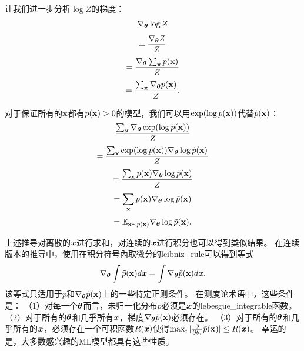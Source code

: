 让我们进一步分析$\log Z$的梯度：
\begin{equation}
	\nabla_{\boldsymbol{\theta}} \log Z
\end{equation}
\begin{equation}
	= \frac{ \nabla_{\boldsymbol{\theta}} Z }{Z}
\end{equation}
\begin{equation}
	= \frac{ \nabla_{\boldsymbol{\theta}} \sum_{\mathbf{x}} \tilde{p}(\mathbf{x}) }{Z}
\end{equation}
\begin{equation}
	= \frac{ \sum_{\mathbf{x}} \nabla_{\boldsymbol{\theta}} \tilde{p}(\mathbf{x}) }{Z}.
\end{equation}


对于保证所有的$\mathbf{x}$都有$p(\mathbf{x}) > 0$的模型，我们可以用$\exp(\log \tilde{p}(\mathbf{x}))$代替$\tilde{p}(\mathbf{x})$：
\begin{equation}
	\frac{ \sum_{\mathbf{x}} \nabla_{\boldsymbol{\theta}} \exp (\log \tilde{p} (\mathbf{x})) }{ Z }
\end{equation}
\begin{equation}
	= \frac{  \sum_{\mathbf{x}}  \exp (\log \tilde{p} (\mathbf{x})) \nabla_{\boldsymbol{\theta}} \log \tilde{p}(\mathbf{x})  }{Z}
\end{equation}
\begin{equation}
	=\frac{  \sum_{\mathbf{x}} \tilde{p} (\mathbf{x})  \nabla_{\boldsymbol{\theta}} \log \tilde{p}(\mathbf{x})  }{ Z}
\end{equation}
\begin{equation}
	=\sum_{\mathbf{x}} p(\mathbf{x}) \nabla_{\boldsymbol{\theta}} \log \tilde{p} ( \mathbf{x} )
 \end{equation}
\begin{equation}
	=\mathbb{E}_{\mathbf{x} \sim p(\mathbf{x})} \nabla_{\boldsymbol{\theta}} \log \tilde{p} (\mathbf{x}).
\end{equation}


上述推导对离散的$\boldsymbol{\mathit{x}}$进行求和，对连续的$\boldsymbol{\mathit{x}}$进行积分也可以得到类似结果。
在连续版本的推导中，使用在积分符号內取微分的\gls{leibniz_rule}可以得到等式
\begin{equation}
	\nabla_{\boldsymbol{\theta}} \int \tilde{p} (\mathbf{x}) d \boldsymbol{\mathit{x}}  = \int \nabla_{\boldsymbol{\theta}} 
\tilde{p} (\mathbf{x}) d \boldsymbol{\mathit{x}}.
\end{equation}
该等式只适用于$\tilde{p}$和$\nabla_{\boldsymbol{\theta}} \tilde{p} (\mathbf{x})$上的一些特定正则条件。
在测度论术语中，这些条件是：
（1）对每一个$\boldsymbol{\theta}$而言，未归一化分布$\tilde{p}$必须是$\boldsymbol{\mathit{x}}$的\gls{lebesgue_integrable}函数。
（2）对于所有的$\boldsymbol{\theta}$和几乎所有$\boldsymbol{\mathit{x}}$，梯度$\nabla_{\boldsymbol{\theta}} \tilde{p}(\mathbf{x})$必须存在。
（3）对于所有的$\boldsymbol{\theta}$和几乎所有的$\boldsymbol{\mathit{x}}$，必须存在一个可积函数$R(\boldsymbol{\mathit{x}})$使得$\max_i | \frac{\partial}{\partial \theta_i } \tilde{p} (\mathbf{x}) | \leq R(\boldsymbol{\mathit{x}})$。
幸运的是，大多数感兴趣的\gls{ML}模型都具有这些性质。

